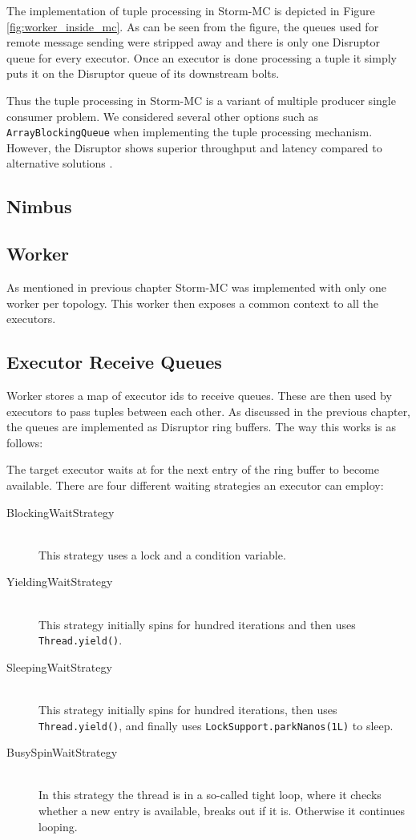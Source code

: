 The implementation of tuple processing in Storm-MC is depicted in Figure \ref{fig:worker_inside_mc}. As can be seen from the figure, the queues used for remote message sending were stripped away and there is only one Disruptor queue for every executor. Once an executor is done processing a tuple it simply puts it on the Disruptor queue of its downstream bolts.

Thus the tuple processing in Storm-MC is a variant of multiple producer single consumer problem. We considered several other options such as \texttt{ArrayBlockingQueue} when implementing the tuple processing mechanism. However, the Disruptor shows superior throughput and latency compared to alternative solutions \citep{DisruptorWiki}.


\subsection{Nimbus}

\subsection{Worker}

As mentioned in previous chapter Storm-MC was implemented with only one worker per topology. This worker then exposes a common context to all the executors.

\subsection{Executor Receive Queues}

Worker stores a map of executor ids to receive queues. These are then used by executors to pass tuples between each other. As discussed in the previous chapter, the queues are implemented as Disruptor ring buffers. The way this works is as follows:

The target executor waits at for the next entry of the ring buffer to become available. There are four different waiting strategies an executor can employ:

\begin{description}
	\item[BlockingWaitStrategy] \hfill \\
	This strategy uses a lock and a condition variable. 
	\item[YieldingWaitStrategy] \hfill \\
	This strategy initially spins for hundred iterations and then uses \texttt{Thread.yield()}.
	\item[SleepingWaitStrategy] \hfill \\
	This strategy initially spins for hundred iterations, then uses \texttt{Thread.yield()}, and finally uses \texttt{LockSupport.parkNanos(1L)} to sleep.
	\item[BusySpinWaitStrategy] \hfill \\
	In this strategy the thread is in a so-called tight loop, where it checks whether a new entry is available, breaks out if it is. Otherwise it continues looping.
\end{description}

